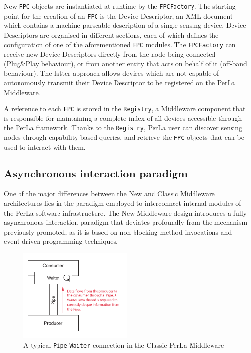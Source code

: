 New \texttt{FPC} objects are instantiated at runtime by the
\texttt{FPCFactory}. The starting point for the creation of an \texttt{FPC} is
the Device Descriptor, an XML document which contains a machine parseable
description of a single sensing device. Device Descriptors are organised in
different sections, each of which defines the configuration of one of the
aforementioned \texttt{FPC} modules. The \texttt{FPCFactory} can receive new
Device Descriptors directly from the node being connected (Plug\&Play
behaviour), or from another entity that acts on behalf of it (off-band
behaviour). The latter approach allows devices which are not capable of
autonomously transmit their Device Descriptor to be registered on the PerLa
Middleware.

A reference to each \texttt{FPC} is stored in the \texttt{Registry}, a
Middleware component that is responsible for maintaining a complete index of
all devices accessible through the PerLa framework. Thanks to the
\texttt{Registry}, PerLa user can discover sensing nodes through
capability-based queries, and retrieve the \texttt{FPC} objects that can be
used to interact with them.

\subsection{Asynchronous interaction paradigm}
\label{sec:newmiddleware.async}

One of the major differences between the New and Classic Middleware
architectures lies in the paradigm employed to interconnect internal modules of
the PerLa software infrastructure. The New Middleware design introduces a fully
asynchronous interaction paradigm that deviates profoundly from the mechanism
previously promoted, as it is based on non-blocking method invocations and
event-driven programming techniques.

\begin{figure}[h!]
    \center
    \includegraphics[width=0.5\textwidth]{imgs/pipe_waiter.pdf}
    \caption{A typical \texttt{Pipe}-\texttt{Waiter} connection in the Classic
        PerLa Middleware}
\end{figure}

